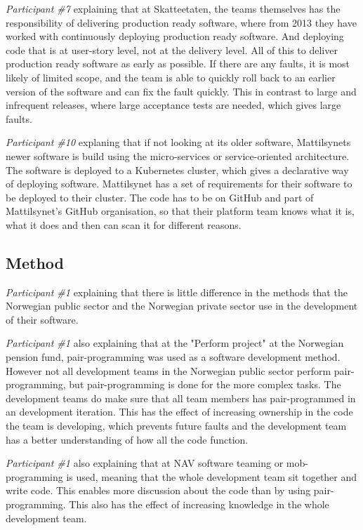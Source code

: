 \textit{Participant \#7} explaining that at Skatteetaten, the teams themselves has the responsibility of delivering production ready software, where from 2013 they have worked with continuously deploying production ready software. And deploying code that is at user-story level, not at the delivery level. All of this to deliver production ready software as early as possible. If there are any faults, it is most likely of limited scope, and the team is able to quickly roll back to an earlier version of the software and can fix the fault quickly. This in contrast to large and infrequent releases, where large acceptance tests are needed, which gives large faults.

\textit{Participant \#10} explaning that if not looking at its older software, Mattilsynets newer software is build using the micro-services or service-oriented architecture. The software is deployed to a Kubernetes cluster, which gives a declarative way of deploying software. Mattilsynet has a set of requirements for their software to be deployed to their cluster. The code has to be on GitHub and part of Mattilsynet's GitHub organisation, so that their platform team knows what it is, what it does and then can scan it for different reasons.

\subsection{Method}
\textit{Participant \#1} explaining that there is little difference in the methods that the Norwegian public sector and the Norwegian private sector use in the development of their software.

\textit{Participant \#1} also explaining that at the "Perform project" at the Norwegian pension fund, pair-programming was used as a software development method. However not all development teams in the Norwegian public sector perform pair-programming, but pair-programming is done for the more complex tasks. The development teams do make sure that all team members has pair-programmed in an development iteration. This has the effect of increasing ownership in the code the team is developing, which prevents future faults and the development team has a better understanding of how all the code function.

\textit{Participant \#1} also explaining that at NAV software teaming or mob-programming is used, meaning that the whole development team sit together and write code. This enables more discussion about the code than by using pair-programming. This also has the effect of increasing knowledge in the whole development team.

